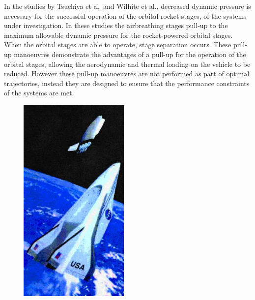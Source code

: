 In the studies by Tsuchiya et al.\cite{Tsuchiya2005} and Wilhite et al.\cite{Wilhite1991}, decreased dynamic pressure is necessary for the successful operation of the orbital rocket stages, of the systems under investigation. In these studies the airbreathing stages pull-up to the maximum allowable dynamic pressure for the rocket-powered orbital stages. When the orbital stages are able to operate, stage separation occurs. These pull-up manoeuvres demonstrate the advantages of a pull-up for the operation of the orbital stages, allowing the aerodynamic and thermal loading on the vehicle to be reduced. However these pull-up manoeuvres are not performed as part of optimal trajectories, instead they are designed to ensure that the performance constraints of the systems are met. 

\begin{figure}
	\centering
	\begin{minipage}[b]{0.3\textwidth}
		\centering
		\includegraphics[width=\linewidth]{"figures/2_literature-review/Mehta Vehicle"}

\end{minipage}
\end{figure}
